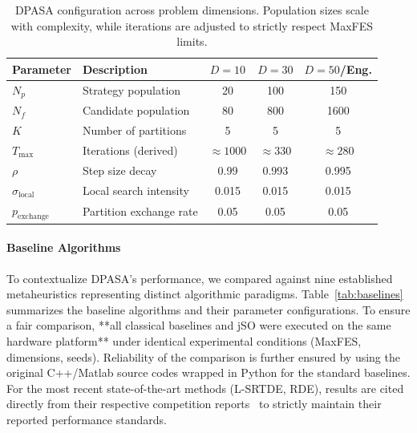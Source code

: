 \documentclass[11pt]{article}
\begin{document}
\begin{table}[ht]
\centering
\caption{DPASA configuration across problem dimensions. Population sizes scale with complexity, while iterations are adjusted to strictly respect MaxFES limits.}
\label{tab:dpasa_config}
\small
\begin{tabular}{@{}llccc@{}}
\toprule
\textbf{Parameter} & \textbf{Description} & \textbf{$D=10$} & \textbf{$D=30$} & \textbf{$D=50$/Eng.} \\
\midrule
$N_p$ & Strategy population & 20 & 100 & 150 \\
$N_f$ & Candidate population & 80 & 800 & 1600 \\
$K$ & Number of partitions & 5 & 5 & 5 \\
\midrule
$T_{\max}$ & Iterations (derived) & $\approx 1000$ & $\approx 330$ & $\approx 280$ \\
$\rho$ & Step size decay & 0.99 & 0.993 & 0.995 \\
$\sigma_{\text{local}}$ & Local search intensity & 0.015 & 0.015 & 0.015 \\
$p_{\text{exchange}}$ & Partition exchange rate & 0.05 & 0.05 & 0.05 \\
\bottomrule
\end{tabular}
\end{table}

\paragraph{Baseline Algorithms} To contextualize DPASA's performance, we compared against nine established metaheuristics representing distinct algorithmic paradigms. Table~\ref{tab:baselines} summarizes the baseline algorithms and their parameter configurations. To ensure a fair comparison, **all classical baselines and jSO were executed on the same hardware platform** under identical experimental conditions (MaxFES, dimensions, seeds). Reliability of the comparison is further ensured by using the original C++/Matlab source codes wrapped in Python for the standard baselines. For the most recent state-of-the-art methods (L-SRTDE, RDE), results are cited directly from their respective competition reports~\cite{stanovov2024lsrtde,tao2024rde} to strictly maintain their reported performance standards.
\end{document}
